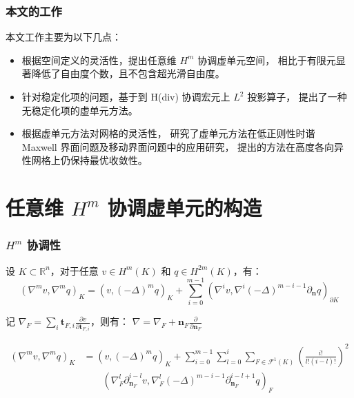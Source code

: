 \documentclass[notheorems,serif]{beamer}
\begin{document}
\begin{frame}
    \frametitle{本文的工作}
    本文工作主要为以下几点：
    \begin{itemize}
        \item 根据空间定义的灵活性，提出任意维 $H^m$ 协调虚单元空间，
            相比于有限元显著降低了自由度个数，且不包含超光滑自由度。
        \item 针对稳定化项的问题，基于到 H(div) 协调宏元上 $L^2$ 投影算子，
            提出了一种无稳定化项的虚单元方法。
        \item 根据虚单元方法对网格的灵活性，
            研究了虚单元方法在低正则性时谐 Maxwell
            界面问题及移动界面问题中的应用研究，
            提出的方法在高度各向异性网格上仍保持最优收敛性。
    \end{itemize}

\end{frame}

\section{任意维 $H^m$ 协调虚单元的构造}
\begin{frame}
    \frametitle{$H^m$ 协调性}
    \begin{lemma}[Green 公式]
        设 $K \subset \mathbb{R}^n$，对于任意 $v \in H^m(K)$ 和 $q \in H^{2m}(K)$，有：
        $$
        (\nabla^m v, \nabla^m q)_K = (v, (-\Delta)^m q)_K + \sum_{i=0}^{m-1}
        (\nabla^i v, \nabla^i(-\Delta)^{m-i-1}\partial_{\boldsymbol{n}}q)_{\partial K}
        $$
    \end{lemma}

    记 $\nabla_F = \sum_{i}\boldsymbol{t}_{F, i} \frac{\partial v}{\partial \boldsymbol{t}_{F, i}}$，则有：
    $\nabla = \nabla_F + \boldsymbol{n}_F \frac{\partial}{\partial \boldsymbol{n}_F}$

    $$
    \begin{aligned}
    (\nabla^m v, \nabla^m q)_K
    &= (v, (-\Delta)^m q)_K + \sum_{i=0}^{m-1}
       \sum_{l=0}^i \sum_{F \in \mathcal{F}^1(K)}
       \left(\frac{i!}{l!(i-l)!}\right)^2 \\
       & \quad\quad(\nabla^l_F \partial^{i-l}_{\boldsymbol{n}_F} v,
       \nabla^l_F (-\Delta)^{m-i-1} \partial^{i-l+1}_{\boldsymbol{n}_F} q)_F
    \end{aligned}
    $$
\end{frame}
\end{document}
